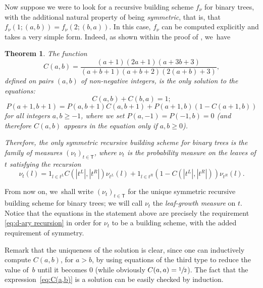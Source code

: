 \documentclass[11pt]{article}
\newcommand{\sT}{\mathsf{T}}
\newtheorem{thm}{Theorem}[section]
\theoremstyle{definition}
\begin{document}
Now suppose we were to look for a recursive building scheme $f_\nu$ for binary trees, with the additional natural property of being \emph{symmetric}, that is, that $f_\nu(1;(a,b))=f_\nu(2; (b,a))$. In this case, $f_\nu$ can be computed explicitly and takes a very simple form. Indeed, as shown within the proof of \cite[Prop.\,5.1]{CS20}, we~have

\begin{thm}\label{thm:defmeasurediscrete}The function
\begin{equation}\label{eq:C(a,b)}C(a,b)=\frac{(a+1)(2a+1)(a+3b+3)}{(a+b+1)(a+b+2)(2(a+b)+3)},\end{equation}
defined on pairs $(a,b)$ of non-negative integers, is the only solution to the equations:
\[
C(a,b)+C(b,a)=1;
\]
\[
P(a+1,b+1)=P(a,b+1)C(a,b+1)+P(a+1,b)(1-C(a+1,b))
\]
for all integers $a,b\geq -1$, where we set $P(a,-1)=P(-1,b)=0$ (and therefore $C(a,b)$ appears in the equation only if $a,b\geq 0$).

Therefore, the only symmetric recursive building scheme for binary trees is the family of measures $(\nu_t)_{t\in \sT}$, where $\nu_t$ is the probability measure on the leaves of $t$ satisfying the recursion
\begin{equation}\nu_t(l)=1_{l\in t^L}C(|t^L|,|t^R|)\nu_{t^L}(l)+1_{l\in t^R}(1-C(|t^L|,|t^R|))\nu_{t^R}(l).\label{recursion with C's}\end{equation}
\end{thm}

From now on, we~shall write $(\nu_t)_{t\in \sT}$ for the unique symmetric recursive building scheme for binary trees; we will call $\nu_t$ the \emph{leaf-growth measure} on $t$. Notice that the equations in the statement above are precisely the requirement \eqref{eq:d-ary recursion} in order for $\nu_t$ to be a building scheme, with the added requirement of symmetry.

Remark that the uniqueness of the solution is clear, since one can inductively compute $C(a,b)$, for $a>b$, by using equations of the third type to reduce the value of~$b$ until it becomes $0$ (while obviously $C(a,a)=\sfrac12$). The fact that the expression~\eqref{eq:C(a,b)} is a solution can be easily checked by induction.
\end{document}
